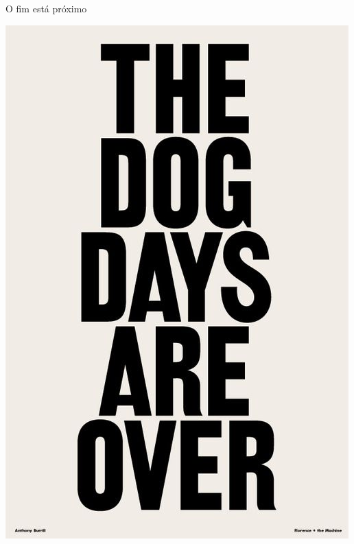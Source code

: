 \documentclass{beamer}
\begin{document}
\begin{frame}{O fim está próximo}
  \begin{center}
    \includegraphics[height=.75\textheight]{Encerramento/dogdaysareover}

    \vfill
  \end{center}
\end{frame}
\end{document}
